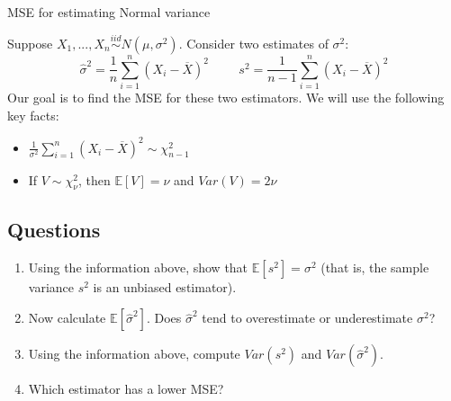 \documentclass[12pt]{article}
\begin{document}
\begin{center}
\Large
MSE for estimating Normal variance \\
\normalsize
\vspace{5mm}
\end{center}

\noindent Suppose $X_1,...,X_n \overset{iid}{\sim} N(\mu, \sigma^2)$. Consider two estimates of $\sigma^2$:
$$\widehat{\sigma}^2 = \frac{1}{n} \sum \limits_{i=1}^n (X_i - \overline{X})^2 \hspace{1cm} s^2 = \frac{1}{n-1} \sum \limits_{i=1}^n (X_i - \overline{X})^2$$
Our goal is to find the MSE for these two estimators. We will use the following key facts:

\begin{itemize}
\item $\frac{1}{\sigma^2} \sum \limits_{i=1}^n (X_i - \overline{X})^2 \sim \chi^2_{n-1}$

\item If $V \sim \chi^2_{\nu}$, then $\mathbb{E}[V] = \nu$ and $Var(V) = 2\nu$
\end{itemize}

\subsection*{Questions}

\begin{enumerate}
\item Using the information above, show that $\mathbb{E}[s^2] = \sigma^2$ (that is, the sample variance $s^2$ is an unbiased estimator). 

\vspace{7cm}

\item Now calculate $\mathbb{E}[\widehat{\sigma}^2]$. Does $\widehat{\sigma}^2$ tend to overestimate or underestimate $\sigma^2$?

\newpage

\item Using the information above, compute $Var(s^2)$ and $Var(\widehat{\sigma}^2)$.

\vspace{12cm}

\item Which estimator has a lower MSE?

\end{enumerate}
\end{document}
